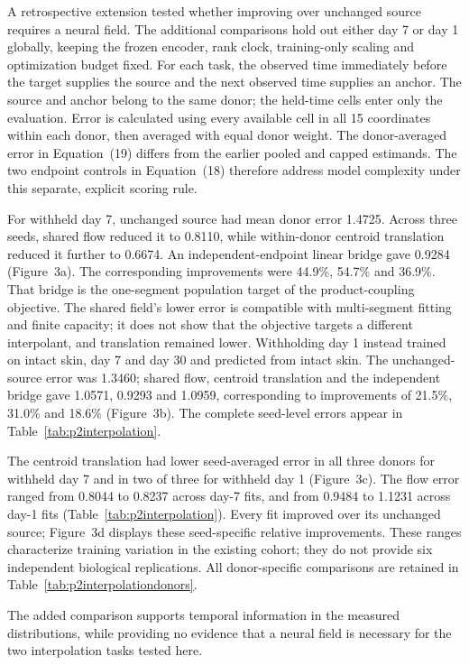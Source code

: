 \documentclass[10pt,a4paper]{article}
\begin{document}
A retrospective extension tested whether improving over unchanged source requires a neural field. The additional comparisons hold out either day 7 or day 1 globally, keeping the frozen encoder, rank clock, training-only scaling and optimization budget fixed. For each task, the observed time immediately before the target supplies the source and the next observed time supplies an anchor. The source and anchor belong to the same donor; the held-time cells enter only the evaluation. Error is calculated using every available cell in all 15 coordinates within each donor, then averaged with equal donor weight. The donor-averaged error in Equation~(19) differs from the earlier pooled and capped estimands. The two endpoint controls in Equation~(18) therefore address model complexity under this separate, explicit scoring rule.

For withheld day 7, unchanged source had mean donor error 1.4725. Across three seeds, shared flow reduced it to 0.8110, while within-donor centroid translation reduced it further to 0.6674. An independent-endpoint linear bridge gave 0.9284 (Figure~3a\label{call:p2f3}). The corresponding improvements were 44.9\%, 54.7\% and 36.9\%. That bridge is the one-segment population target of the product-coupling objective. The shared field's lower error is compatible with multi-segment fitting and finite capacity; it does not show that the objective targets a different interpolant, and translation remained lower. Withholding day 1 instead trained on intact skin, day 7 and day 30 and predicted from intact skin. The unchanged-source error was 1.3460; shared flow, centroid translation and the independent bridge gave 1.0571, 0.9293 and 1.0959, corresponding to improvements of 21.5\%, 31.0\% and 18.6\% (Figure~3b). The complete seed-level errors appear in Table~\ref{tab:p2interpolation}.




The centroid translation had lower seed-averaged error in all three donors for withheld day 7 and in two of three for withheld day 1 (Figure~3c). The flow error ranged from 0.8044 to 0.8237 across day-7 fits, and from 0.9484 to 1.1231 across day-1 fits (Table~\ref{tab:p2interpolation}). Every fit improved over its unchanged source; Figure~3d displays these seed-specific relative improvements. These ranges characterize training variation in the existing cohort; they do not provide six independent biological replications. All donor-specific comparisons are retained in Table~\ref{tab:p2interpolationdonors}.

The added comparison supports temporal information in the measured distributions, while providing no evidence that a neural field is necessary for the two interpolation tasks tested here.
\end{document}

